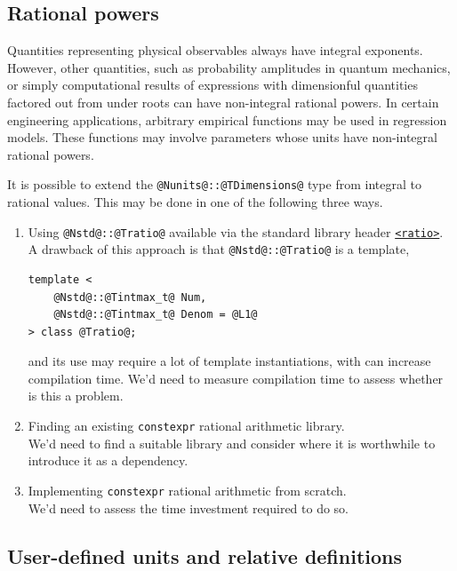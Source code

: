 \documentclass[11pt,letterpaper]{article}
\begin{document}
\subsection{Rational powers} %

Quantities representing physical observables always have integral exponents.
However, other quantities, such as probability amplitudes in quantum mechanics,
or simply computational results of expressions with dimensionful quantities factored out
from under roots can have non-integral rational powers.
In certain engineering applications, arbitrary empirical functions may be used in
regression models. These functions may involve parameters whose units have non-integral rational
powers.

It is possible to extend the \lstinline{@Nunits@::@TDimensions@} type from integral to
rational values.
This may be done in one of the following three ways.
\begin{enumerate}
  \item Using \lstinline{@Nstd@::@Tratio@} available via the standard library header
    \href{https://en.cppreference.com/w/cpp/header/ratio.html}{\lstinline{<ratio>}}. \\
    A drawback of this approach is that \lstinline{@Nstd@::@Tratio@} is a template,
%
\begin{lstlisting}
template <
    @Nstd@::@Tintmax_t@ Num,
    @Nstd@::@Tintmax_t@ Denom = @L1@
> class @Tratio@;
\end{lstlisting}
    and its use may require a lot of template instantiations,
    with can increase compilation time.
    We'd need to measure compilation time to assess whether is this a problem.
  \item Finding an existing \lstinline{constexpr} rational arithmetic library. \\
    We'd need to find a suitable library and consider where it is worthwhile to
    introduce it as a dependency.
  \item Implementing \lstinline{constexpr} rational arithmetic from scratch. \\
    We'd need to assess the time investment required to do so.

\end{enumerate}

\subsection{User-defined units and relative definitions} %

\end{document}

